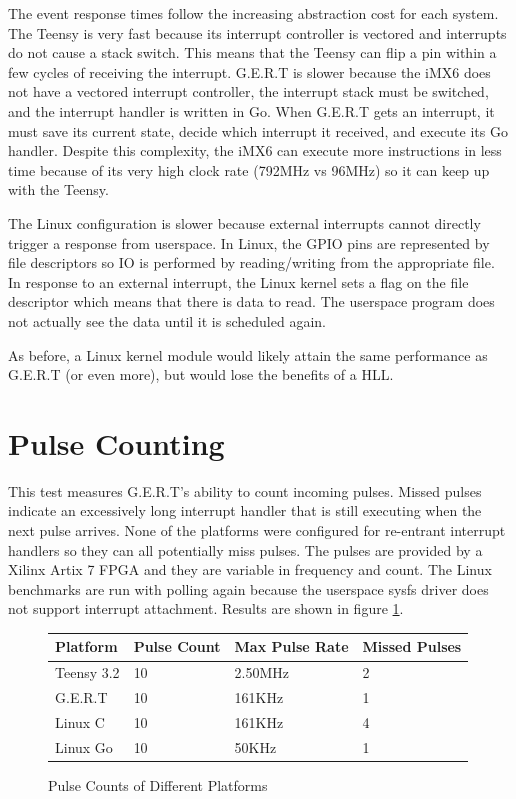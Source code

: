 The event response times follow the increasing abstraction cost for each system.
The Teensy is very fast because its interrupt controller is vectored and interrupts
do not cause a stack switch. This means that the Teensy can flip a pin within a few cycles
of receiving the interrupt. G.E.R.T is slower because the iMX6 does not have a
vectored interrupt controller, the interrupt stack must be switched, and the
interrupt handler is written in Go. When G.E.R.T gets an interrupt, it must save its
current state, decide which interrupt it received, and execute its Go handler. Despite this
complexity, the iMX6 can execute more instructions in less time because of its very
high clock rate (792MHz vs 96MHz) so it can keep up with the Teensy.

The Linux configuration is slower because external interrupts cannot directly trigger a response
from userspace. In Linux, the GPIO pins are represented by file descriptors so
IO is performed by reading/writing from the appropriate file. In response to an external interrupt,
the Linux kernel sets a flag on the file descriptor which means that there is data to read. The userspace
program does not actually see the data until it is scheduled again.

As before, a Linux kernel module would likely attain the same performance as G.E.R.T
(or even more), but would lose the benefits of a HLL.


\section{Pulse Counting}\label{sec:pulse_count}
This test measures G.E.R.T's ability to count incoming pulses. Missed pulses
indicate an excessively long interrupt handler that is still executing when the next
pulse arrives. None of the platforms were configured for re-entrant interrupt handlers
so they can all potentially miss pulses.
The pulses are provided by a Xilinx Artix 7 FPGA and they are variable in
frequency and count. The Linux benchmarks are run with polling again because the
userspace sysfs driver does not support interrupt attachment.
Results are shown in figure \ref{fig:counter}.


\begin{figure} [h]
\begin{center}
  \begin{tabular}{ | l | l | l | l |}
    \hline
    Platform & Pulse Count & Max Pulse Rate & Missed Pulses \\ \hline
    Teensy 3.2 & 10 & 2.50MHz & 2 \\ \hline
    G.E.R.T & 10 & 161KHz & 1 \\ \hline
    Linux C & 10 & 161KHz & 4 \\ \hline
    Linux Go & 10 & 50KHz & 1 \\
    \hline
  \end{tabular}
\end{center}
  \caption{Pulse Counts of Different Platforms}  \label{fig:counter}
\end{figure}

